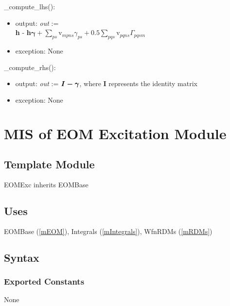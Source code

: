 \documentclass[12pt, titlepage]{article}
\begin{document}
\noindent \_compute\_lhs():
\begin{itemize}
	\item output: \textit{out} :=\\
	\textbf{h} - \textbf{h}$\boldsymbol{\gamma}
	+\sum_{ps}$v$_{mpns} \gamma_{ps} 
	+ 0.5\sum_{pqs}$v$_{pqns}\Gamma_{pqsm}$
	\item exception: None 
\end{itemize}

\noindent\_compute\_rhs():
\begin{itemize}
	\item output: \textit{out} := $\boldmath{I} - \boldsymbol{\gamma}$, where 
	\textbf{I} represents the identity matrix
	\item exception: None 
\end{itemize}

\newpage

\section{MIS of EOM Excitation Module} \label{mEOMExc}

\subsection{Template Module}

EOMExc inherits EOMBase

\subsection{Uses}
EOMBase (\ref{mEOM}), Integrals (\ref{mIntegrals}), WfnRDMs (\ref{mRDMs})

\subsection{Syntax}

\subsubsection{Exported Constants}
None
\end{document}
